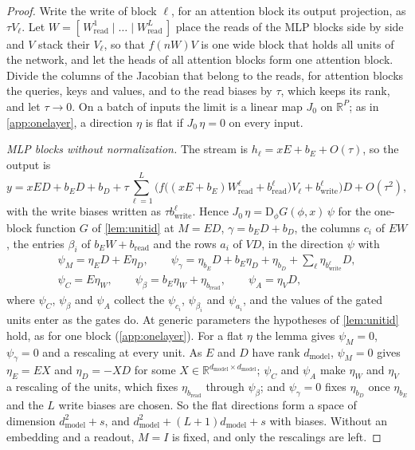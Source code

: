 \documentclass[10pt]{article}
\theoremstyle{definition}
\theoremstyle{remark}
\newcommand{\R}{\mathbb{R}}
\newcommand{\Wread}{W_{\mathrm{read}}}
\newcommand{\dm}{d_{\mathrm{model}}}
\newcommand{\Der}{\mathrm{D}}
\begin{document}
\begin{proof}
Write the write of block $\ell$, for an attention block its output projection, as $\tau V_\ell$. Let $W = [\,\Wread^{1} \mid \dots \mid \Wread^{L}\,]$ place the reads of the MLP blocks side by side and $V$ stack their $V_\ell$, so that $f(nW)V$ is one wide block that holds all units of the network, and let the heads of all attention blocks form one attention block. Divide the columns of the Jacobian that belong to the reads, for attention blocks the queries, keys and values, and to the read biases by $\tau$, which keeps its rank, and let $\tau \to 0$. On a batch of inputs the limit is a linear map $J_0$ on $\R^P$; as in \cref{app:onelayer}, a direction $\eta$ is flat if $J_0\,\eta = 0$ on every input.

\emph{MLP blocks without normalization.} The stream is $h_\ell = xE + b_E + O(\tau)$, so the output is
\[
y = xED + b_ED + b_D + \tau\sum_{\ell=1}^{L}\Big(f\big((xE + b_E)\Wread^{\ell} + b^{\ell}_{\mathrm{read}}\big)V_\ell + b^{\ell}_{\mathrm{write}}\Big)D + O(\tau^2),
\]
with the write biases written as $\tau b^{\ell}_{\mathrm{write}}$. Hence $J_0\,\eta = \Der_\phi G(\phi, x)\,\psi$ for the one-block function $G$ of \cref{lem:unitid} at $M = ED$, $\gamma = b_ED + b_D$, the columns $c_i$ of $EW$, the entries $\beta_i$ of $b_EW + b_{\mathrm{read}}$ and the rows $a_i$ of $VD$, in the direction $\psi$ with
\begin{gather*}
\psi_M = \eta_ED + E\eta_D,\qquad \psi_\gamma = \eta_{b_E}D + b_E\eta_D + \eta_{b_D} + \textstyle\sum_\ell \eta_{b^{\ell}_{\mathrm{write}}}D,\\
\psi_C = E\eta_W,\qquad \psi_\beta = b_E\eta_W + \eta_{b_{\mathrm{read}}},\qquad \psi_A = \eta_VD,
\end{gather*}
where $\psi_C$, $\psi_\beta$ and $\psi_A$ collect the $\psi_{c_i}$, $\psi_{\beta_i}$ and $\psi_{a_i}$, and the values of the gated units enter as the gates do. At generic parameters the hypotheses of \cref{lem:unitid} hold, as for one block (\cref{app:onelayer}). For a flat $\eta$ the lemma gives $\psi_M = 0$, $\psi_\gamma = 0$ and a rescaling at every unit. As $E$ and $D$ have rank $\dm$, $\psi_M = 0$ gives $\eta_E = EX$ and $\eta_D = -XD$ for some $X \in \R^{\dm\times\dm}$; $\psi_C$ and $\psi_A$ make $\eta_W$ and $\eta_V$ a rescaling of the units, which fixes $\eta_{b_{\mathrm{read}}}$ through $\psi_\beta$; and $\psi_\gamma = 0$ fixes $\eta_{b_D}$ once $\eta_{b_E}$ and the $L$ write biases are chosen. So the flat directions form a space of dimension $\dm^2 + s$, and $\dm^2 + (L+1)\dm + s$ with biases. Without an embedding and a readout, $M = I$ is fixed, and only the rescalings are left.


\end{proof}
\end{document}
